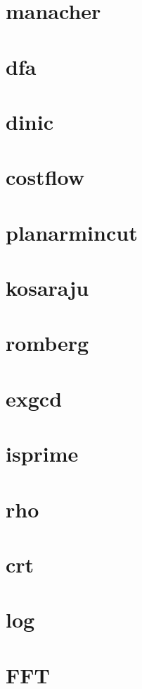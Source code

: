 \documentclass[
	10pt,
	twocolumn,
	a4paper,
]{article}
\begin{document}
\section{manacher}

\section{dfa}


\section{dinic}

\section{costflow}

\section{planarmincut}

\section{kosaraju}


\section{romberg}

\section{exgcd}

\section{isprime}

\section{rho}

\section{crt}

\section{log}

\section{FFT}

\end{document}
